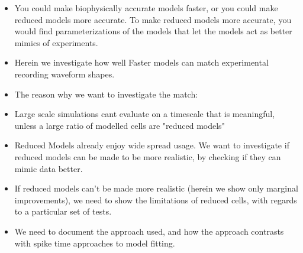 \documentclass{article}
\begin{document}
\begin{itemize}
\item You could make biophysically accurate models faster, or you could make reduced models more accurate. To make reduced models more accurate, you would find parameterizations of the models that let the models act as better mimics of experiments.
\item Herein we investigate how well Faster models can match experimental recording waveform shapes.
\item The reason why we want to investigate the match:
\item Large scale simulations cant evaluate on a timescale that is meaningful, unless a large ratio of modelled cells are "reduced models"
\item Reduced Models already enjoy wide spread usage. We want to investigate if reduced models can be made to be more realistic, by checking if they can mimic data better.
\item If reduced models can't be made more realistic (herein we show only marginal improvements), we need to show the limitations of reduced cells, with regards to a particular set of tests.
\item We need to document the approach used, and how the approach contrasts with spike time approaches to model fitting.
\end{itemize}
\end{document}
